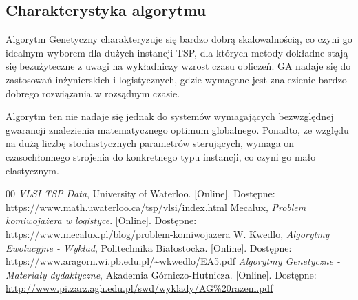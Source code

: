 \documentclass[conference]{IEEEtran}
\begin{document}
        \subsection{Charakterystyka algorytmu}
            Algorytm Genetyczny charakteryzuje się bardzo dobrą skalowalnością, co czyni go idealnym wyborem dla dużych instancji TSP, dla których metody dokładne stają się bezużyteczne z uwagi na wykładniczy wzrost czasu obliczeń. GA nadaje się do zastosowań inżynierskich i logistycznych, gdzie wymagane jest znalezienie bardzo dobrego rozwiązania w rozsądnym czasie.

            Algorytm ten nie nadaje się jednak do systemów wymagających bezwzględnej gwarancji znalezienia matematycznego optimum globalnego. Ponadto, ze względu na dużą liczbę stochastycznych parametrów sterujących, wymaga on czasochłonnego strojenia do konkretnego typu instancji, co czyni go mało elastycznym.


    \begin{thebibliography}{00}
         \textit{VLSI TSP Data}, University of Waterloo. [Online]. Dostępne: \url{https://www.math.uwaterloo.ca/tsp/vlsi/index.html}
         Mecalux, \textit{Problem komiwojażera w logistyce}. [Online]. Dostępne: \url{https://www.mecalux.pl/blog/problem-komiwojazera}
         W. Kwedlo, \textit{Algorytmy Ewolucyjne - Wykład}, Politechnika Białostocka. [Online]. Dostępne: \url{https://www.aragorn.wi.pb.edu.pl/~wkwedlo/EA5.pdf}
         \textit{Algorytmy Genetyczne - Materiały dydaktyczne}, Akademia Górniczo-Hutnicza. [Online]. Dostępne: \url{http://www.pi.zarz.agh.edu.pl/swd/wyklady/AG%20razem.pdf}
    \end{thebibliography}
\end{document}
